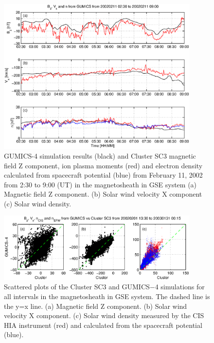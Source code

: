 \documentclass[linenumbers,draft]{agujournal}
\begin{document}
\begin{figure}[h]
\centering
\includegraphics[width=0.9\textwidth,angle=0]{swe-2020-corr-f08.eps}  
\caption{GUMICS-4 simulation results (black) and Cluster SC3 magnetic field Z component, ion plasma moments (red) and electron density calculated from spacecraft potential (blue) from February 11, 2002 from 2:30 to 9:00 (UT) in the magnetosheath in GSE system  (a) Magnetic field Z component. (b) Solar wind velocity X component (c) Solar wind density.}
\label{fig:mshplot}
\end{figure}

\pagebreak

\begin{figure}[h]
\centering
\includegraphics[width=0.9\textwidth,angle=0]{swe-2020-corr-f09.eps}
\caption{Scattered plots of the Cluster SC3 and GUMICS$-$4 simulations for all intervals in the magnetosheath in GSE system. The dashed line is the y=x line. (a) Magnetic field Z component. (b) Solar wind velocity X component. (c) Solar wind density measured by the CIS HIA instrument (red) and calculated from the spacecraft potential (blue).}
\label{fig:mshscatplot}
\end{figure}

\pagebreak
\end{document}
